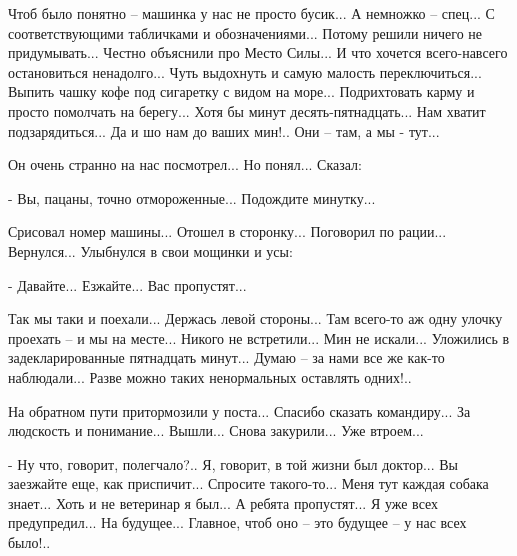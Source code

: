 Чтоб было понятно – машинка у нас не просто бусик... А немножко – спец... С
соответствующими табличками и обозначениями... Потому решили ничего не
придумывать... Честно объяснили про Место Силы... И что хочется всего-навсего
остановиться ненадолго... Чуть выдохнуть и самую малость переключиться... Выпить
чашку кофе под сигаретку с видом на море... Подрихтовать карму и просто
помолчать на берегу... Хотя бы минут десять-пятнадцать... Нам хватит
подзарядиться... Да и шо нам до ваших мин!.. Они – там, а мы - тут...

Он очень странно на нас посмотрел... Но понял... Сказал:

- Вы, пацаны, точно отмороженные... Подождите минутку...

Срисовал номер машины... Отошел в сторонку... Поговорил по рации... Вернулся...
Улыбнулся в свои мощинки и усы:

- Давайте... Езжайте... Вас пропустят...

Так мы таки и поехали... Держась левой стороны... Там всего-то аж одну улочку
проехать – и мы на месте... Никого не встретили... Мин не искали... Уложились в
задекларированные пятнадцать минут... Думаю – за нами все же как-то наблюдали...
Разве можно таких ненормальных оставлять одних!..

На обратном пути притормозили у поста... Спасибо сказать командиру... За
людскость и понимание... Вышли... Снова закурили... Уже втроем...

- Ну что, говорит, полегчало?.. Я, говорит, в той жизни был доктор... Вы
заезжайте еще, как приспичит... Спросите такого-то... Меня тут каждая собака
знает... Хоть и не ветеринар я был... А ребята пропустят... Я уже всех
предупредил... На будущее... Главное, чтоб оно – это будущее – у нас всех
было!..

